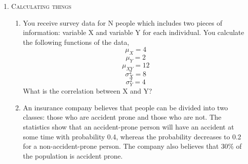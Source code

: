 \documentclass[11pt,letterpaper]{article}
\numberwithin{equation}{section}
\begin{document}
\begin{enumerate}[I]
\begin{enumerate}
\item Suppose that 
$$f_{XY}(x,y)=\begin{cases} 6e^{-2x-3y} & \text{for } 0< x \text{ and }0<y \\ \\ 0 &\text{else}
\end{cases}$$
\begin{enumerate}[1)]
\item  Verify that $f_{XY}(x,y$) is a pdf. 
\item Are X and Y independent?
\item What is $f_{y|x}(y)$?
\end{enumerate}
\item A pizza restaurant promises to deliver your order to the table within 10 minutes. Let Y be the time between ordering and the arrival of the pizza and suppose that the pdf of Y is:
$$f_{Y}(y)=\begin{cases} ky^2 & \text{for } 0<y< 10\\ 0 &\text{else}\end{cases}$$
\begin{enumerate}[1)]
\item Determine the value of k.
\item What is $Var(Y)$?
\item  Find the cdf of Y and graph it.
\end{enumerate}
\item A median is a value m such that $P (X \leq m) \geq 1/2$ and $P (X \geq m) \geq 1/2$. If $X$ is continuous, $m$ satisfies  $\int_{-\infty}^m f (x)dx = \int_m^{\infty} f(x)dx = 1/2$. Find the median for
\begin{enumerate}
\item Uniform(a, b) distribution
\item Exponential($\lambda$) distribution $f(x)=\lambda e^{-\lambda x}$.
\end{enumerate}
\end{enumerate}
\pagebreak
\item \textsc{Calculating things}
\begin{enumerate}[1)]
\item You receive survey data for N people which includes two pieces of information: variable X and variable Y for each individual. You calculate the following functions of the data,
$$\mu_X=4$$
$$\mu_Y=2$$
$$\mu_{XY}=12$$
$$\sigma_X^2=8$$
$$\sigma_Y^2=4$$
What is the correlation between X and Y?
\item An insurance company believes that people can be divided into two classes: those who are accident prone and those who are not. The statistics show that an accident-prone person will have an accident at some time with probability 0.4, whereas the probability decreases to 0.2 for a non-accident-prone person. The company also believes that 30\% of the population is accident prone.

\end{enumerate}
\end{enumerate}
\end{document}
